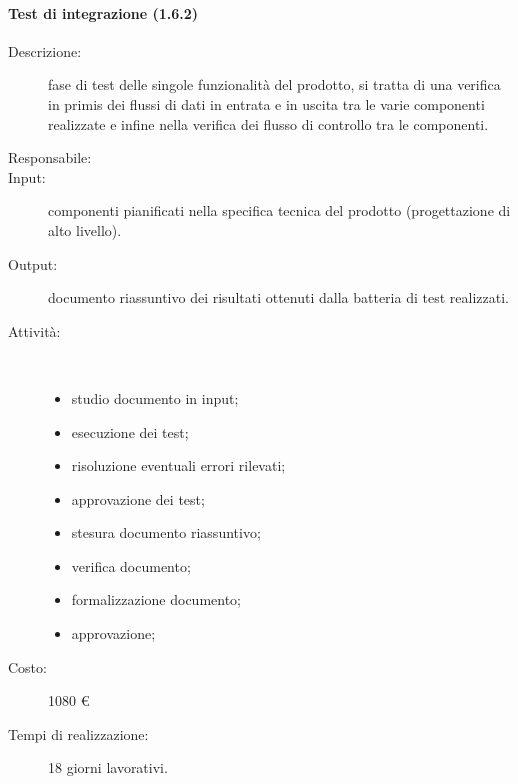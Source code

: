 \paragraph{Test di integrazione (1.6.2)}
\begin{description}
\item[Descrizione:] fase di test delle singole funzionalità del prodotto, si tratta di una verifica in primis dei flussi di dati in entrata e in uscita tra le varie componenti realizzate e infine nella verifica dei flusso di controllo tra le componenti.
\item[Responsabile:] 
\item[Input:] componenti pianificati nella specifica tecnica del prodotto (progettazione di alto livello).
\item[Output:] documento riassuntivo dei risultati ottenuti dalla batteria di test realizzati.
\item[Attività:]\mbox{}\\[-1.5\baselineskip]
	\begin{itemize}
	\item studio documento in input;
	\item esecuzione dei test;
	\item risoluzione eventuali errori rilevati;
	\item approvazione dei test;
	\item stesura documento riassuntivo;
	\item verifica documento;
	\item formalizzazione documento;
	\item approvazione;
	\end{itemize}
\item[Costo:] 1080 \euro{}
\item[Tempi di realizzazione:] 18 giorni lavorativi.
\end{description}

